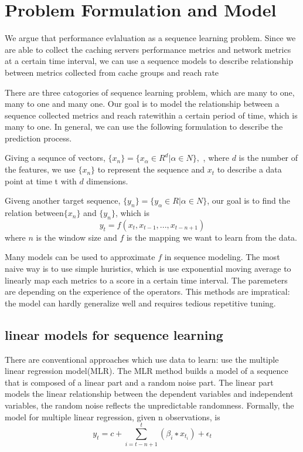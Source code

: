 \documentclass[5p]{elsarticle}
\newcommand{\dabiaolv}{reach rate}
\begin{document}
\section{Problem Formulation and Model}
We argue that performance evlaluation as a sequence learning problem. Since we are able to collect the caching servers performance metrics and network metrics at a certain time interval, we can use a sequence models to describe relationship between metrics collected from  cache groups and \dabiaolv

There are three catogories of sequence learning problem, which are many to one, many to one and many one. Our goal is to model the relationship between a sequence collected metrics and \dabiaolv within a certain period of time, which is many to one. In general, we can use the following formulation to describe the prediction process.

Giving a sequnce of vectors, $\{x_n\}=\{x_{\alpha} \in R^{d}|\alpha \in N\}, $ , where $d$ is the number of the features, we use $\{x_n\}$ to represent the sequence and $x_t$ to describe a data point at time t with $d$ dimensions.

Giveng another target sequence, $\{y_n\}=\{y_{\alpha} \in R|\alpha \in N\}$, our goal is to find the relation between$\{x_n\}$ and $\{y_n\}$, which is 
$$y_t=f(x_{t},x_{t-1},...,x_{t-n+1})$$
where $n$ is the window size and $f$ is the mapping we want to learn from the data.

Many models can be used to approximate $f$ in sequence modeling. The most naive way is to use simple huristics, which is use exponential moving average to linearly map each metrics to a score in a certain time interval. The paremeters are depending on the experience of the operators. This methods are impratical: the model can hardly generalize well and requires tedious repetitive tuning.

\subsection{linear models for sequence learning}

There are conventional approaches which use data to learn: use the multiple linear regression model(MLR). The MLR method builds a model of a sequence that is composed of a linear part and a random noise part. The linear part models the linear relationship between the dependent variables and independent variables, the random noise reflects the unpredictable randomness. Formally, the model for multiple linear regression, given n observations, is 
    $$y_t = c+\sum_{i=t-n+1}^{t}(\beta_i ∗ x_{t_i})+\epsilon_t$$
\end{document}
